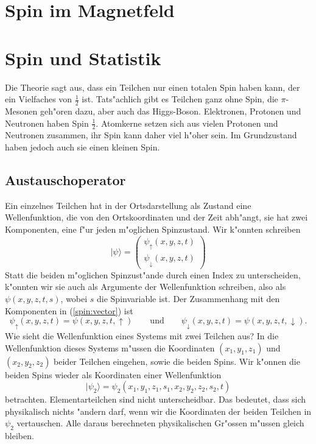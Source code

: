 \section{Spin im Magnetfeld}

\section{Spin und Statistik}
Die Theorie sagt aus, dass ein Teilchen nur einen totalen Spin haben kann,
der ein Vielfaches von $\frac12$ ist. Tats"achlich gibt es Teilchen
ganz ohne Spin, die $\pi$-Mesonen geh"oren dazu, aber auch das Higgs-Boson.
Elektronen, Protonen und Neutronen haben Spin $\frac12$. 
Atomkerne setzen sich aus vielen Protonen und Neutronen zusammen, ihr
Spin kann daher viel h"oher sein. Im Grundzustand haben jedoch auch
sie einen kleinen Spin.

\subsection{Austauschoperator}
Ein einzelnes Teilchen hat in der Ortsdarstellung als Zustand
eine Wellenfunktion, die von den Ortskoordinaten und der Zeit abh"angt,
sie hat zwei Komponenten, eine f"ur jeden m"oglichen Spinzustand.
Wir k"onnten schreiben
\begin{equation}
|\psi\rangle
=
\begin{pmatrix}
\psi_\uparrow(x,y,z,t)\\
\psi_\downarrow(x,y,z,t)
\end{pmatrix}
\label{spin:vector}
\end{equation}
Statt die beiden m"oglichen Spinzust"ande durch einen Index zu unterscheiden,
k"onnten wir sie auch als Argumente der Wellenfunktion schreiben, also
als $\psi(x,y,z,t,s)$, wobei $s$ die Spinvariable ist. Der Zusammenhang
mit den Komponenten in (\ref{spin:vector}) ist
\[
\psi_\uparrow(x,y,z,t)
=
\psi(x,y,z,t,\uparrow)
\qquad\text{und}\qquad
\psi_\downarrow(x,y,z,t)
=
\psi(x,y,z,t,\downarrow).
\]
Wie sieht die Wellenfunktion eines Systems mit zwei Teilchen aus?
In die Wellenfunktion dieses Systems m"ussen die Koordinaten
$(x_1,y_1,z_1)$ und $(x_2,y_2,z_2)$ beider Teilchen eingehen, 
sowie die beiden Spins. Wir k"onnen die beiden Spins wieder als
Koordinaten einer Wellenfunktion
\[
|\psi_2\rangle
=
\psi_2(x_1,y_1,z_1,s_1,x_2,y_2,z_2,s_2,t)
\]
betrachten.
Elementarteilchen sind nicht unterscheidbar. Das bedeutet, dass sich
physikalisch nichts "andern darf, wenn wir die Koordinaten der beiden
Teilchen in $\psi_2$ vertauschen. Alle daraus berechneten physikalischen
Gr"ossen m"ussen gleich bleiben.

